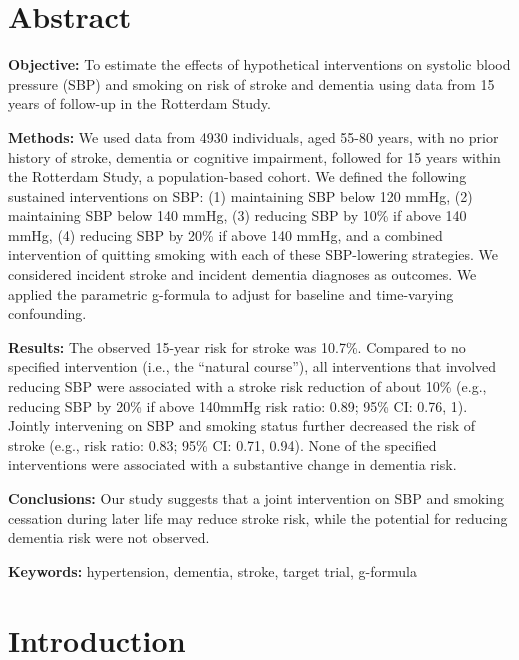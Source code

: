 \documentclass[
]{book}
\begin{document}

\newpage

\hypertarget{abstract-1}{%
\section{Abstract}\label{abstract-1}}

\textbf{Objective:} To estimate the effects of hypothetical interventions on systolic blood pressure (SBP) and smoking on risk of stroke and dementia using data from 15 years of follow-up in the Rotterdam Study.

\textbf{Methods:} We used data from 4930 individuals, aged 55-80 years, with no prior history of stroke, dementia or cognitive impairment, followed for 15 years within the Rotterdam Study, a population-based cohort. We defined the following sustained interventions on SBP: (1) maintaining SBP below 120 mmHg, (2) maintaining SBP below 140 mmHg, (3) reducing SBP by 10\% if above 140 mmHg, (4) reducing SBP by 20\% if above 140 mmHg, and a combined intervention of quitting smoking with each of these SBP-lowering strategies. We considered incident stroke and incident dementia diagnoses as outcomes. We applied the parametric g-formula to adjust for baseline and time-varying confounding.

\textbf{Results:} The observed 15-year risk for stroke was 10.7\%. Compared to no specified intervention (i.e., the ``natural course''), all interventions that involved reducing SBP were associated with a stroke risk reduction of about 10\% (e.g., reducing SBP by 20\% if above 140mmHg risk ratio: 0.89; 95\% CI: 0.76, 1). Jointly intervening on SBP and smoking status further decreased the risk of stroke (e.g., risk ratio: 0.83; 95\% CI: 0.71, 0.94). None of the specified interventions were associated with a substantive change in dementia risk.

\textbf{Conclusions:} Our study suggests that a joint intervention on SBP and smoking cessation during later life may reduce stroke risk, while the potential for reducing dementia risk were not observed.

\textbf{Keywords:} hypertension, dementia, stroke, target trial, g-formula

\newpage

\hypertarget{introduction-1}{%
\section{Introduction}\label{introduction-1}}
\end{document}

